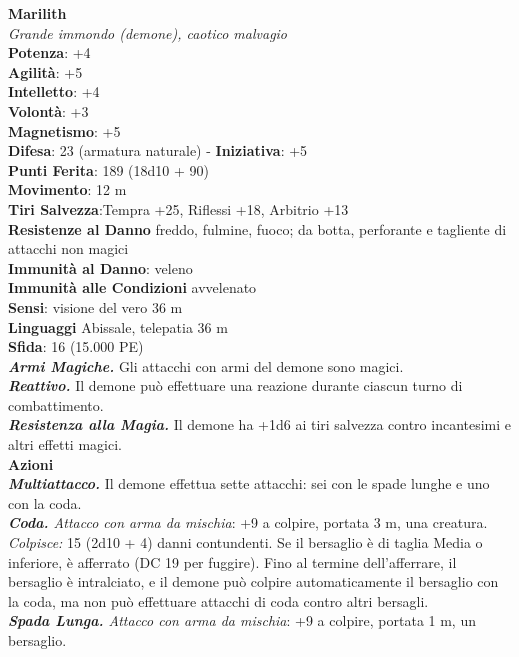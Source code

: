 \begin{multicols}{2}
\medskip\textbf{Marilith}\\
\emph{Grande immondo (demone), caotico malvagio}\\
\textbf{Potenza}: +4\\
\textbf{Agilità}: +5\\
\textbf{Intelletto}: +4\\
\textbf{Volontà}: +3\\
\textbf{Magnetismo}: +5\\
\textbf{Difesa}: 23 (armatura naturale) - \textbf{Iniziativa}: +5\\
\textbf{Punti Ferita}: 189 (18d10 + 90)\\
\textbf{Movimento}: 12 m\\
\textbf{Tiri Salvezza}:Tempra +25, Riflessi +18, Arbitrio +13\\
\textbf{Resistenze al Danno} freddo, fulmine, fuoco; da botta, perforante e tagliente di attacchi non magici\\
\textbf{Immunità al Danno}: veleno\\
\textbf{Immunità alle Condizioni} avvelenato\\
\textbf{Sensi}: visione del vero 36 m\\
\textbf{Linguaggi} Abissale, telepatia 36 m\\
\textbf{Sfida}: 16 (15.000 PE)\smallskip\\
\emph{\textbf{Armi Magiche.}} Gli attacchi con armi del demone sono magici.\\
\emph{\textbf{Reattivo.}} Il demone può effettuare una reazione durante ciascun turno di combattimento.\\
\emph{\textbf{Resistenza alla Magia.}} Il demone ha +1d6 ai tiri salvezza contro incantesimi e altri effetti magici.\\
\smallskip\textbf{Azioni}\\
\emph{\textbf{Multiattacco.}} Il demone effettua sette attacchi: sei con le spade lunghe e uno con la coda.\\
\emph{\textbf{Coda.} Attacco con arma da mischia}: +9 a colpire, portata 3 m, una creatura.\\
\emph{Colpisce:} 15 (2d10 + 4) danni contundenti. Se il bersaglio è di taglia Media o inferiore, è afferrato (DC 19 per fuggire). Fino al termine dell'afferrare, il bersaglio è intralciato, e il demone può colpire automaticamente il bersaglio con la coda, ma non può effettuare attacchi di coda contro altri bersagli.\\
\emph{\textbf{Spada Lunga.} Attacco con arma da mischia}: +9 a colpire, portata 1 m, un bersaglio.\\

\end{multicols}
